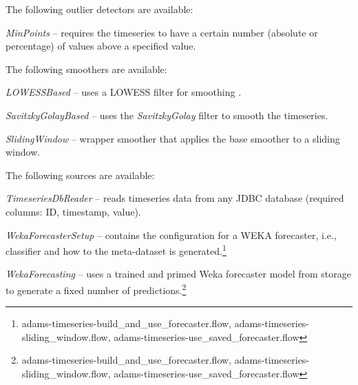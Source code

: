 \documentclass[a4paper]{book}
\begin{document}
\noindent The following outlier detectors are available:
\begin{tight_itemize}
	\item \textit{MinPoints} -- requires the timeseries to have a certain 
	number (absolute or percentage) of values above a specified value.
\end{tight_itemize}

\noindent The following smoothers are available:
\begin{tight_itemize}
	\item \textit{LOWESSBased} -- uses a LOWESS filter for smoothing \cite{lowess}.
	\item \textit{SavitzkyGolayBased} -- uses the \textit{SavitzkyGolay} filter
	to smooth the timeseries.\cite{savitzky}
	\item \textit{SlidingWindow} -- wrapper smoother that applies the base 
	smoother to a sliding window.
\end{tight_itemize}

\noindent The following sources are available:
\begin{tight_itemize}
	\item \textit{TimeseriesDbReader} -- reads timeseries data from any
	JDBC database (required columns: ID, timestamp, value).
	\item \textit{WekaForecasterSetup} -- contains the configuration for a
	WEKA forecaster, i.e., classifier and how to the meta-dataset is 
	generated.\footnote{adams-timeseries-build\_and\_use\_forecaster.flow, adams-timeseries-sliding\_window.flow, adams-timeseries-use\_saved\_forecaster.flow}
	\item \textit{WekaForecasting} -- uses a trained and primed Weka forecaster
	model from storage to generate a fixed number of 
	predictions.\footnote{adams-timeseries-build\_and\_use\_forecaster.flow, adams-timeseries-sliding\_window.flow, adams-timeseries-use\_saved\_forecaster.flow}
\end{tight_itemize}
\end{document}
